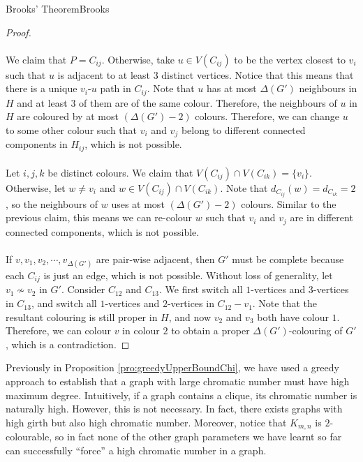 \documentclass[math]{amznotes}
\theoremstyle{remark}
\newcommand{\0}{\mathbf{0}}
\newcommand{\1}{\mathbf{1}}
\begin{document}
\begin{thmbox}{Brooks' Theorem}{Brooks}
\begin{proof}
        \\\\
        We claim that $P = C_{ij}$. Otherwise, take $u \in V(C_{ij})$ to be the vertex closest to $v_i$ such that $u$ is adjacent to at least $3$ distinct vertices. Notice that this means that there is a unique $v_i$-$u$ path in $C_{ij}$. Note that $u$ has at most $\Delta(G')$ neighbours in $H$ and at least $3$ of them are of the same colour. Therefore, the neighbours of $u$ in $H$ are coloured by at most $(\Delta(G') - 2)$ colours. Therefore, we can change $u$ to some other colour such that $v_i$ and $v_j$ belong to different connected components in $H_{ij}$, which is not possible.
        \\\\
        Let $i, j, k$ be distinct colours. We claim that $V(C_{ij}) \cap V(C_{ik}) = \{v_i\}$. Otherwise, let $w \neq v_i$ and $w \in V(C_{ij}) \cap V(C_{ik})$. Note that $d_{C_{ij}}(w) = d_{C_{ik}} = 2$, so the neighbours of $w$ uses at most $(\Delta(G') - 2)$ colours. Similar to the previous claim, this means we can re-colour $w$ such that $v_i$ and $v_j$ are in different connected components, which is not possible.
        \\\\
        If $v, v_1, v_2, \cdots, v_{\Delta(G')}$ are pair-wise adjacent, then $G'$ must be complete because each $C_{ij}$ is just an edge, which is not possible. Without loss of generality, let $v_1 \not\sim v_2$ in $G'$. Consider $C_{12}$ and $C_{13}$. We first switch all $1$-vertices and $3$-vertices in $C_{13}$, and switch all $1$-vertices and $2$-vertices in $C_{12} - v_1$. Note that the resultant colouring is still proper in $H$, and now $v_2$ and $v_3$ both have colour $1$. Therefore, we can colour $v$ in colour $2$ to obtain a proper $\Delta(G')$-colouring of $G'$, which is a contradiction.
    \end{proof}
\end{thmbox}
Previously in Proposition \ref{pro:greedyUpperBoundChi}, we have used a greedy approach to establish that a graph with large chromatic number must have high maximum degree. Intuitively, if a graph contains a clique, its chromatic number is naturally high. However, this is not necessary. In fact, there exists graphs with high girth but also high chromatic number. Moreover, notice that $K_{m, n}$ is $2$-colourable, so in fact none of the other graph parameters we have learnt so far can successfully ``force'' a high chromatic number in a graph.
\end{document}
